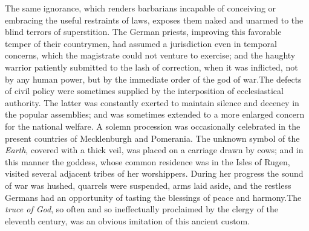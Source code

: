 
The same ignorance, which renders barbarians incapable of
conceiving or embracing the useful restraints of laws, exposes
them naked and unarmed to the blind terrors of superstition. The
German priests, improving this favorable temper of their
countrymen, had assumed a jurisdiction even in temporal concerns,
which the magistrate could not venture to exercise; and the
haughty warrior patiently submitted to the lash of correction,
when it was inflicted, not by any human power, but by the
immediate order of the god of war.\footnotemark[64] The defects of civil policy
were sometimes supplied by the interposition of ecclesiastical
authority. The latter was constantly exerted to maintain silence
and decency in the popular assemblies; and was sometimes extended
to a more enlarged concern for the national welfare. A solemn
procession was occasionally celebrated in the present countries
of Mecklenburgh and Pomerania. The unknown symbol of the \textit{Earth},
covered with a thick veil, was placed on a carriage drawn by
cows; and in this manner the goddess, whose common residence was
in the Isles of Rugen, visited several adjacent tribes of her
worshippers. During her progress the sound of war was hushed,
quarrels were suspended, arms laid aside, and the restless
Germans had an opportunity of tasting the blessings of peace and
harmony.\footnotemark[65] The \textit{truce of God}, so often and so ineffectually
proclaimed by the clergy of the eleventh century, was an obvious
imitation of this ancient custom.\footnotemark[66]




